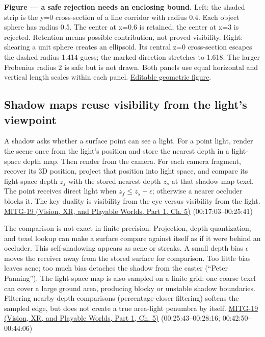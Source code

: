 \textbf{Figure --- a safe rejection needs an enclosing bound.} Left: the shaded strip is the y=0 cross-section of a line corridor with radius 0.4. Each object sphere has radius 0.5. The center at x=0.6 is retained; the center at x=3 is rejected. Retention means possible contribution, not proved visibility. Right: shearing a unit sphere creates an ellipsoid. Its central z=0 cross-section escapes the dashed radius-1.414 guess; the marked direction stretches to 1.618. The larger Frobenius radius 2 is safe but is not drawn. Both panels use equal horizontal and vertical length scales within each panel. \href{../current/Assets/Print/016860dc0184c06f711840f56b538b20ca1c1da2056933afcee968eb701078d3.svg}{Editable geometric figure}.

\subsection{Shadow maps reuse visibility from the light's viewpoint}\label{04-visual-computing-ii-ch028-shadow-maps-reuse-visibility-from-the-lights-viewpoint}

\hypertarget{04-visual-computing-ii-ch028-shadow-maps-reuse-visibility-from-the-lights-viewpoint}{}

A shadow asks whether a surface point can see a light. For a point light, render the scene once from the light's position and store the nearest depth in a light-space depth map. Then render from the camera. For each camera fragment, recover its 3D position, project that position into light space, and compare its light-space depth \(z_f\) with the stored nearest depth \(z_s\) at that shadow-map texel. The point receives direct light when \(z_f\le z_s+\epsilon\); otherwise a nearer occluder blocks it. The key duality is visibility from the eye versus visibility from the light. \href{../07-Vision-XR-and-Playable-Worlds-P01/main.pdf\#nameddest=04-visual-computing-ii-ch036-mitg-19---shadow-maps}{MITG-19 (Vision, XR, and Playable Worlds, Part 1, Ch. 5)} (00:17:03--00:25:41)

The comparison is not exact in finite precision. Projection, depth quantization, and texel lookup can make a surface compare against itself as if it were behind an occluder. This self-shadowing appears as acne or streaks. A small depth bias \(\epsilon\) moves the receiver away from the stored surface for comparison. Too little bias leaves acne; too much bias detaches the shadow from the caster (``Peter Panning''). The light-space map is also sampled on a finite grid: one coarse texel can cover a large ground area, producing blocky or unstable shadow boundaries. Filtering nearby depth comparisons (percentage-closer filtering) softens the sampled edge, but does not create a true area-light penumbra by itself. \href{../07-Vision-XR-and-Playable-Worlds-P01/main.pdf\#nameddest=04-visual-computing-ii-ch036-mitg-19---shadow-maps}{MITG-19 (Vision, XR, and Playable Worlds, Part 1, Ch. 5)} (00:25:43--00:28:16; 00:42:50--00:44:06)

